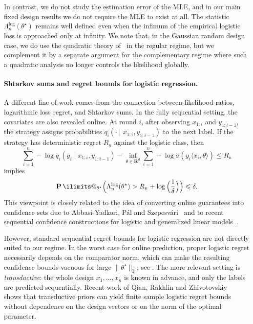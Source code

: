 \documentclass[11pt, letterpaper, hidelinks]{article}
\makeatletter
\newcommand{\R}{\mathbf R}
\newcommand{\1}{\mathbf 1}
\renewcommand{\le}{\leqslant}
\renewcommand{\P}{\operatorname*{\mathbf{P}}\ilimits@}
\theoremstyle{plain}
\theoremstyle{definition}
\newcommand{\thetastar}{\theta^\star}
\makeatother
\begin{document}
In contrast, we do not study the estimation error of the MLE, and in our main
fixed design results we do not require the MLE to exist at all. The statistic
\(\Lambda_n^{\operatorname{log}}(\thetastar)\) remains well defined even when
the infimum of the empirical logistic loss is approached only at infinity. We
note that, in the Gaussian random design case, we do use the quadratic theory
of~\cite{chardon2024logistic} in the regular regime, but we complement it by a
separate argument for the complementary regime where such a quadratic
analysis no longer controls the likelihood globally.

\paragraph{Shtarkov sums and regret bounds for logistic regression.}

A different line of work comes from the connection between likelihood ratios,
logarithmic loss regret, and Shtarkov sums. In the fully sequential setting,
the covariates are also revealed online.  At round
\(i\), after observing \(x_{1:i}\) and \(y_{1:i-1}\), the strategy assigns
probabilities \(q_i(\cdot\mid x_{1:i},y_{1:i-1})\) to the next label. If the
strategy has deterministic regret \(R_n\) against the logistic class, then
\[
\sum_{i=1}^n
-\log q_i(y_i\mid x_{1:i},y_{1:i-1})
-
\inf_{\theta\in\R^d}
\sum_{i=1}^n
-\log \sigma(y_i\langle x_i,\theta\rangle)
\le R_n
\]
implies
\[
\P_{\thetastar}\Big(
\Lambda_n^{\operatorname{log}}(\thetastar)
>
R_n+\log\Big(\frac{1}{\delta}\Big)
\Big)
\le \delta.
\]
This viewpoint is closely related to the idea of converting online guarantees into confidence sets due to
Abbasi-Yadkori, P{\'a}l and Szepesv{\'a}ri~\cite{AbbasiYadkorietal2012} and to
recent sequential confidence constructions for logistic and generalized linear
models~\cite{lee2024improved,kirschner2025confidence,clerico2025confidence}.

However, standard sequential regret bounds for logistic regression
\cite{kakade2005online} are not directly suited to our regime. In the worst case
for online prediction, proper logistic regret necessarily depends on the comparator
norm, which can make the resulting confidence bounds vacuous for large
\(\|\thetastar\|_2\); see \cite{foster2018logistic}. The more relevant setting
is \emph{transductive}: the whole design \(x_1,\ldots,x_n\) is known in advance,
and only the labels are predicted sequentially. Recent work of Qian, Rakhlin
and Zhivotovskiy~\cite{QianRakhlinZhivotovskiy2026} shows that transductive
priors can yield finite sample logistic regret bounds without dependence on the
design vectors or on the norm of the optimal parameter.
\end{document}
